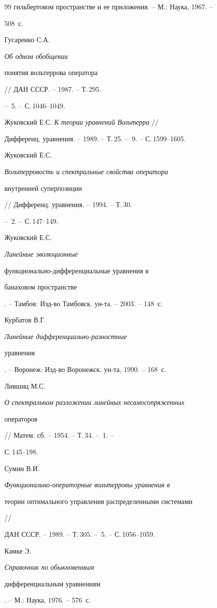 \begin{thebibliography}{99}
{гильбертовом пространстве и ее приложения}. -- М.: Наука, 1967. --


508~с.




Гусаренко С.А. {\em Об одном обобщении


понятия вольтеррова оператора} // ДАН СССР. -- 1987. -- Т.\,295.


-- \No\,5. -- С.\,1046--1049.




Жуковский Е.С. {\em К теории уравнений Вольтерра} //


Дифференц. уравнения. -- 1989. -- Т.\,25. -- \No\,9. -- С.\,1599--1605.




Жуковский Е.С. {\em Вольтерровость и спектральные свойства оператора


внутренней суперпозиции} // Дифференц. уравнения. -- 1994. -- Т.\,30.


-- \No\,2. -- С.\,147--149.




Жуковский Е.С. {\em Линейные эволюционные


функционально-дифференциальные уравнения в


банаховом пространстве}. -- Тамбов: Изд-во Тамбовск. ун-та. -- 2003. -- 148~с.




Курбатов В.Г. {\em Линейные дифференциально-разностные


уравнения}. -- Воронеж: Изд-во Воронежск. ун-та, 1990. -- 168~с.




Лившиц М.С. {\em О спектральном разложении линейных несамосопряженных


операторов} // Матем. сб. -- 1954. -- Т.\,34. -- \No\,1. --


С.\,145--198.




Сумин В.И. {\em Функционально-операторные вольтерровы уравнения в


теории оптимального управления распределенными системами} //


ДАН СССР. -- 1989. -- Т.\,305. -- \No\,5. -- С.\,1056--1059.




Камке Э. {\em Справочник по обыкновенным


дифференциальным уравнениям}. -- М.: Наука, 1976. -- 576~с.



\end{thebibliography}
